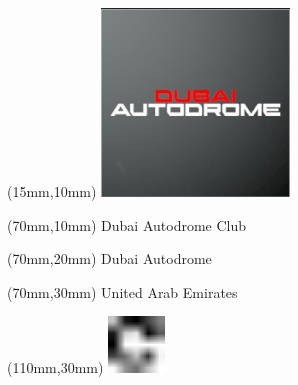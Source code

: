 \null\newpage
\begin{textblock*}{50mm}(15mm,10mm)%
\includegraphics[width=50mm]{LG/2015-05-20_00081.png}
\end{textblock*}
\begin{textblock*}{130mm}(70mm,10mm)%
{\fontsize{20}{20}\selectfont Dubai Autodrome Club}\\
\end{textblock*}
\begin{textblock*}{120mm}(70mm,20mm)%
{\fontsize{16}{16}\selectfont Dubai Autodrome}\\
\end{textblock*}
\begin{textblock*}{120mm}(70mm,30mm)%
{\fontsize{12}{12}\selectfont United Arab Emirates}
\end{textblock*}
\begin{textblock*}{30mm}(110mm,30mm)%
\centering
\includegraphics[height=15mm]{icons/fa-rotate-right.pdf}
\end{textblock*}
